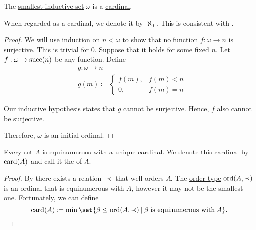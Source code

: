 \begin{proposition}\label{thm:omega_is_a_cardinal}
  The \hyperref[thm:smallest_inductive_set_existence]{smallest inductive set} \( \omega \) is a \hyperref[def:cardinal]{cardinal}.

  When regarded as a cardinal, we denote it by \( \aleph_0 \). This is consistent with .
\end{proposition}
\begin{proof}
  We will use induction on \( n < \omega \) to show that no function \( f: \omega \to n \) is surjective. This is trivial for \( 0 \). Suppose that it holds for some fixed \( n \). Let \( f: \omega \to \operatorname{succ}(n) \) be any function. Define
  \begin{equation*}
    \begin{aligned}
      &g: \omega \to n \\
      &g(m) \coloneqq \begin{cases}
        f(m), &f(m) < n \\
        0,    &f(m) = n
      \end{cases}
    \end{aligned}
  \end{equation*}

  Our inductive hypothesis states that \( g \) cannot be surjective. Hence, \( f \) also cannot be surjective.

  Therefore, \( \omega \) is an initial ordinal.
\end{proof}

\begin{proposition}\label{thm:cardinality_existence}
  Every set \( A \) is equinumerous with a unique \hyperref[def:cardinal]{cardinal}. We denote this cardinal by \( \operatorname{card}(A) \) and call it the  of \( A \).
\end{proposition}
\begin{proof}
  By  there exists a relation \( \prec \) that well-orders \( A \). The \hyperref[thm:well_ordered_order_type_existence]{order type} \( \operatorname{ord}(A, \prec) \) is an ordinal that is equinumerous with \( A \), however it may not be the smallest one. Fortunately, we can define
  \begin{equation*}
    \card(A) \coloneqq \min\set{ \beta \leq \ord(A, \prec) \given \beta \T{is equinumerous with} A }.
  \end{equation*}
\end{proof}

